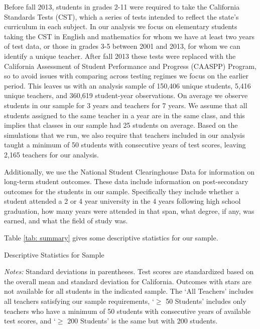 \documentclass[letterpaper,12pt]{article}
\begin{document}
Before fall 2013, students in grades 2-11 were required to take the California Standards Tests (CST), which a series of tests intended to reflect the state's curriculum in each subject. In our analysis we focus on elementary students taking the CST in English and mathematics for whom we have at least two years of test data, or those in grades 3-5 between 2001 and 2013, for whom we can identify a unique teacher. After fall 2013 these tests were replaced with the California Assessment of Student Performance and Progress (CAASPP) Program, so to avoid issues with comparing across testing regimes we focus on the earlier period. This leaves us with an analysis sample of 150,406 unique students, 5,416 unique teachers, and 360,619 student-year observations. On average we observe students in our sample for 3 years and teachers for 7 years. We assume that all students assigned to the same teacher in a year are in the same class, and this implies that classes in our sample had 25 students on average. Based on the simulations that we run, we also require that teachers included in our analysis taught a minimum of 50 students with consecutive years of test scores, leaving 2,165 teachers for our analysis.

Additionally, we use the National Student Clearinghouse Data for information on long-term student outcomes. These data include information on post-secondary outcomes for the students in our sample. Specifically they include whether a student attended a 2 or 4 year university in the 4 years following high school graduation, how many years were attended in that span, what degree, if any, was earned, and what the field of study was.

Table \ref{tab: summary} gives some descriptive statistics for our sample.

\begin{table}[ht]
    \centering
    \caption{Descriptive Statistics for Sample}
    
    \label{tab: summary}
    \caption*{\scriptsize \textit{Notes:} Standard deviations in parentheses. Test scores are standardized based on the overall mean and standard deviation for California. Outcomes with stars are not available for all students in the indicated sample. The `All Teachers' includes all teachers satisfying our sample requirements, `$\geq$ 50 Students' includes only teachers who have a minimum of 50 students with consecutive years of available test scores, and `$\geq$ 200 Students' is the same but with 200 students.}
\end{table}
\end{document}
